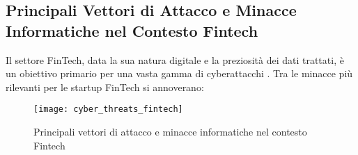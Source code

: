\subsection{Principali Vettori di Attacco e Minacce Informatiche nel Contesto Fintech}

Il settore FinTech, data la sua natura digitale e la preziosità dei dati trattati, è un obiettivo primario per una vasta gamma di cyberattacchi \cite{cyberThreatsFintech}. Tra le minacce più rilevanti per le startup FinTech si annoverano:

\begin{figure}[h]
    \centering
    \texttt{[image: cyber\_threats\_fintech]}
    \caption{Principali vettori di attacco e minacce informatiche nel contesto Fintech}
    \label{fig:cyber_threats}
\end{figure}

